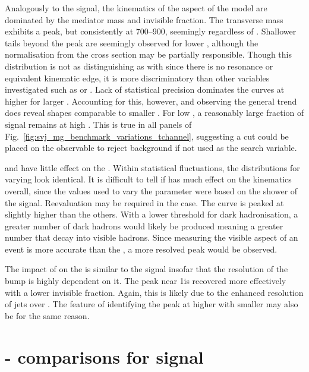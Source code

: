Analogously to the \schannel signal, the kinematics of the \tchannel aspect of the model are dominated by the mediator mass and invisible fraction. The transverse mass exhibits a peak, but consistently at 700--900\GeV, seemingly regardless of \mBifund. Shallower tails beyond the peak are seemingly observed for lower \mBifund, although the normalisation from the cross section may be partially responsible. Though this distribution is not as distinguishing as with \schannel since there is no resonance or equivalent kinematic edge, it is more discriminatory than other variables investigated such as \ptmiss or \HT. Lack of statistical precision dominates the curves at higher \mT for larger \mBifund. Accounting for this, however, and observing the general trend does reveal shapes comparable to smaller \mBifund. For low \mBifund, a reasonably large fraction of signal remains at high \mT. This is true in all panels of Fig.~\ref{fig:svj_mg_benchmark_variations_tchannel}, suggesting a cut could be placed on the observable to reject background if not used as the search variable.

\mDark and \aDark have little effect on the \mT. Within statistical fluctuations, the distributions for varying \mDark look identical. It is difficult to tell if \aDark has much effect on the kinematics overall, since the values used to vary the parameter were based on the shower of the \schannel signal. Reevaluation may be required in the \tchannel case. The \aDarkLow curve is peaked at slightly higher \mT than the others. With a lower threshold for dark hadronisation, a greater number of dark hadrons would likely be produced meaning a greater number that decay into visible hadrons. Since measuring the visible aspect of an event is more accurate than the \ptvecmiss, a more resolved peak would be observed.

The impact of \rinv on the \mT is similar to the \schannel signal insofar that the resolution of the bump is highly dependent on it. The peak near 1\TeV is recovered more effectively with a lower invisible fraction. Again, this is likely due to the enhanced resolution of \glspl{jet} over \ptvecmiss. The feature of identifying the peak at higher \mT with smaller \rinv may also be for the same reason.




\section{\texorpdfstring{\PYTHIA}{Pythia}-\texorpdfstring{\MADGRAPH}{MadGraph} comparisons for \texorpdfstring{\schannel}{s-channel} signal}
\label{sec:svj_schannel_comparisons}

